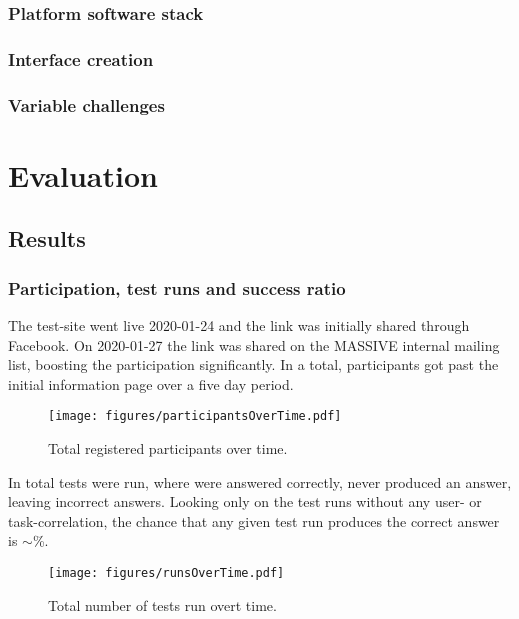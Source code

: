 \documentclass[nofilelist,dvipsnames]{cslthse-msc}
\begin{document}
			\subsection{Platform software stack}

			\subsection{Interface creation}

			\subsection{Variable challenges}

	\chapter{Evaluation}

		\section{Results}

			\subsection{Participation, test runs and success ratio}

				The test-site went live 2020-01-24 and the link was initially shared
				through Facebook. On 2020-01-27 the link was shared on
				the MASSIVE internal mailing list, boosting the participation
				significantly. In a total,
				 participants got past the initial information
				page over a five day period.

				\begin{figure}[h!]
					\centering
					\texttt{[image: figures/participantsOverTime.pdf]}
					\caption{Total registered participants over time.}
				\end{figure}

				In total  tests were run, where
				 were answered correctly,
				 never produced an answer, leaving
				 incorrect answers. Looking only on the test
				runs without any user- or task-correlation, the chance that any given test run
				produces the correct answer is $\sim$\%.

				\begin{figure}[h!]
					\centering
					\texttt{[image: figures/runsOverTime.pdf]}
					\caption{Total number of tests run overt time.}
				\end{figure}
\end{document}
